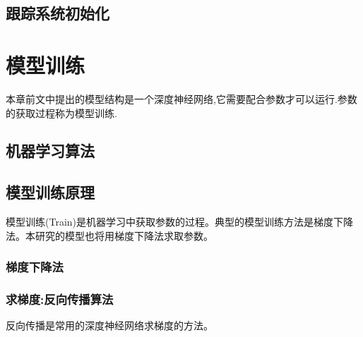 \subsection{跟踪系统初始化}


\section{模型训练}
本章前文中提出的模型结构是一个深度神经网络,它需要配合参数才可以运行.参数的获取过程称为模型训练.

\subsection{机器学习算法}

\subsection{模型训练原理}
模型训练(Train)是机器学习中获取参数的过程。典型的模型训练方法是梯度下降法。本研究的模型也将用梯度下降法求取参数。
\subsubsection{梯度下降法}

\subsubsection{求梯度:反向传播算法}
反向传播是常用的深度神经网络求梯度的方法。